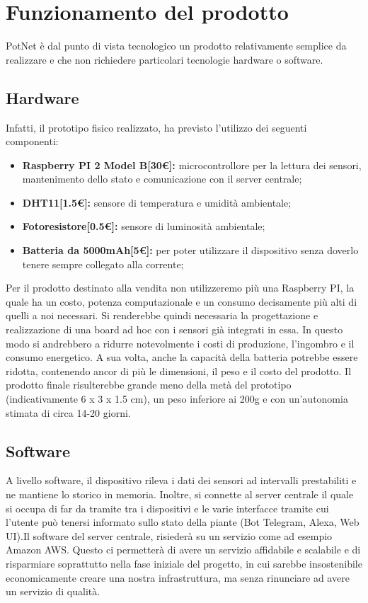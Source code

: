 \section{Funzionamento del prodotto}

PotNet è dal punto di vista tecnologico un prodotto relativamente semplice da realizzare e che non richiedere particolari tecnologie hardware o software. 

\subsection{Hardware}

Infatti, il prototipo fisico realizzato, ha previsto l'utilizzo dei seguenti componenti:

\begin{itemize}
	\item \textbf{Raspberry PI 2 Model B[30€]:} microcontrollore per la lettura dei sensori, mantenimento dello stato e comunicazione con il server centrale;
	\item \textbf{DHT11[1.5€]:} sensore di temperatura e umidità ambientale;
	\item \textbf{Fotoresistore[0.5€]:} sensore di luminosità ambientale;
	\item \textbf{Batteria da 5000mAh[5€]:} per poter utilizzare il dispositivo senza doverlo tenere sempre collegato alla corrente;
\end{itemize}

Per il prodotto destinato alla vendita non utilizzeremo più una Raspberry PI, la quale ha un costo, potenza computazionale e un consumo decisamente più alti di quelli a noi necessari. Si renderebbe quindi necessaria la progettazione e realizzazione di una board ad hoc con i sensori già integrati in essa. In questo modo si andrebbero a ridurre notevolmente i costi di produzione, l'ingombro e il consumo energetico. A sua volta, anche la capacità della batteria potrebbe essere ridotta, contenendo ancor di più le dimensioni, il peso e il costo del prodotto. Il prodotto finale risulterebbe grande meno della metà del prototipo (indicativamente 6 x 3 x 1.5 cm), un peso inferiore ai 200g e con un'autonomia stimata di circa 14-20 giorni.

\subsection{Software}

A livello software, il dispositivo rileva i dati dei sensori ad intervalli prestabiliti e ne mantiene lo storico in memoria. Inoltre, si connette al server centrale il quale si occupa di far da tramite tra i dispositivi e le varie interfacce tramite cui l'utente può tenersi informato sullo stato della piante (Bot Telegram, Alexa, Web UI).\newline\newline Il software del server centrale, risiederà su un servizio come ad esempio Amazon AWS. Questo ci permetterà di avere un servizio affidabile e scalabile e di risparmiare soprattutto nella fase iniziale del progetto, in cui sarebbe insostenibile economicamente creare una nostra infrastruttura, ma senza rinunciare ad avere un servizio di qualità.


